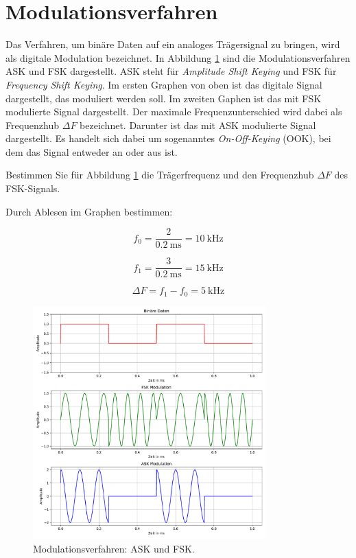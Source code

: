 \newpage

\section{Modulationsverfahren}

Das Verfahren, um binäre Daten auf ein analoges Trägersignal zu bringen, wird als digitale Modulation bezeichnet. 
In Abbildung \ref{fig:ook_modulation} sind die Modulationsverfahren ASK und FSK dargestellt. ASK steht für \textit{Amplitude Shift Keying} und FSK für \textit{Frequency Shift Keying}. 
Im ersten Graphen von oben ist das digitale Signal dargestellt, das moduliert werden soll.
Im zweiten Gaphen ist das mit FSK modulierte Signal dargestellt. Der maximale Frequenzunterschied wird dabei als Frequenzhub $\Delta F$ bezeichnet.
Darunter ist das mit ASK modulierte Signal dargestellt. Es handelt sich dabei um sogenanntes \textit{On-Off-Keying} (OOK), bei dem das Signal entweder an oder aus ist.

\begin{aufgabe}
    Bestimmen Sie für Abbildung \ref{fig:ook_modulation} die Trägerfrequenz und den Frequenzhub $\Delta F$ des FSK-Signals.
\end{aufgabe}

\begin{lösung}
    Durch Ablesen im Graphen bestimmen:

    \[
    f_{0} = \frac{2}{\SI{0,2}{\milli\second}} = \SI{10}{\kilo\hertz}
    \]

    \[
    f_{1} = \frac{3}{\SI{0,2}{\milli\second}} = \SI{15}{\kilo\hertz}
    \]

    \[
    \Delta F = f_{1} - f_{0} = \SI{5}{\kilo\hertz}
    \]
\end{lösung}

\begin{figure}[H]
    \centering
    \includegraphics[width=0.8\textwidth]{images/ASK_FSK.pdf}
    \caption{Modulationsverfahren: ASK und FSK.}
    \label{fig:ook_modulation}
\end{figure}

